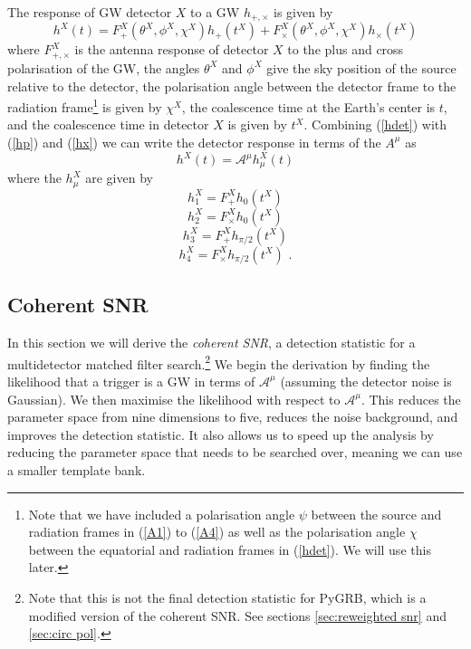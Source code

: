 \documentclass[11pt]{cuthesis}
\begin{document}
The response of GW detector $X$ to a GW $h_{+,\times}$ is given by
\begin{equation} \label{hdet}
h^X(t) = F^X_+(\theta^X,\phi^X,\chi^X) h_+(t^X) + F^X_\times(\theta^X,\phi^X,\chi^X) h_\times (t^X)
\end{equation}
where $F_{+,\times}^X$ is the antenna response of detector $X$ to the plus and cross polarisation of the GW, the angles $\theta^X$ and $\phi^X$ give the sky position of the source relative to the detector, the polarisation angle between the detector frame to the radiation frame\footnote{Note that we have included a polarisation angle $\psi$ between the source and radiation frames in (\ref{A1}) to (\ref{A4}) as well as the polarisation angle $\chi$ between the equatorial and radiation frames in (\ref{hdet}). We will use this later.} is given by $\chi^X$, the coalescence time at the Earth's center is $t$, and the coalescence time in detector $X$ is given by $t^X$. Combining (\ref{hdet}) with (\ref{hp}) and (\ref{hx}) we can write the detector response in terms of the $A^\mu$ as
\begin{equation} \label{h in A}
h^X(t) = \mathcal{A}^\mu h_\mu^X(t) 
\end{equation}
where the $h_\mu^X$ are given by
\begin{equation}
h_1^X = F_+^X h_0(t^X) 
\end{equation}
\begin{equation}
h_2^X = F_\times^X h_0(t^X) 
\end{equation}
\begin{equation}
h_3^X = F_+^X h_{\pi/2}(t^X) 
\end{equation}
\begin{equation}
h_4^X = F_\times^X h_{\pi/2}(t^X) \textbf{ .} 
\end{equation}

\subsection{Coherent SNR} \label{sec:coh snr}
In this section we will derive the \textit{coherent SNR}, a detection statistic for a multidetector matched filter search.\footnote{Note that this is not the final detection statistic for PyGRB, which is a modified version of the coherent SNR. See sections \ref{sec:reweighted snr} and \ref{sec:circ pol}.} We begin the derivation by finding the likelihood that a trigger is a GW in terms of $\mathcal{A}^\mu$ (assuming the detector noise is Gaussian). We then maximise the likelihood with respect to $\mathcal{A}^\mu$. This reduces the parameter space from nine dimensions to five, reduces the noise background, and improves the detection statistic. It also allows us to speed up the analysis by reducing the parameter space that needs to be searched over, meaning we can use a smaller template bank.
\end{document}
